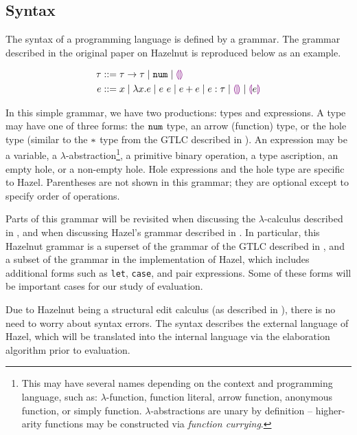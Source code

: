 \subsection{Syntax}
\label{sec:syntax}

The syntax of a programming language is defined by a grammar. The grammar described in the original paper on Hazelnut \cite{conf/popl/Hazelnut17} is reproduced below as an example.

\begin{singlespace}
  \begin{align*}
    \tau &::= \tau\to\tau
         \mid\mathtt{num}
         \mid\textcolor{violet}{\llparenthesis}\textcolor{violet}{\rrparenthesis} \\
    e &::= x
         \mid\lambda x.e
         \mid e\ e
         \mid e+e
         \mid e:\tau
         \mid\textcolor{violet}{\llparenthesis}\textcolor{violet}{\rrparenthesis}
         \mid\textcolor{violet}{\llparenthesis} e\textcolor{violet}{\rrparenthesis}
  \end{align*}
\end{singlespace}

In this simple grammar, we have two productions: types and expressions. A type may have one of three forms: the $\mathtt{num}$ type, an arrow (function) type, or the hole type (similar to the $*$ type from the GTLC described in ). An expression may be a variable, a $\lambda$-abstraction\footnote{This may have several names depending on the context and programming language, such as: $\lambda$-function, function literal, arrow function, anonymous function, or simply function. $\lambda$-abstractions are unary by definition -- higher-arity functions may be constructed via \textit{function currying}.}, a primitive binary operation, a type ascription, an empty hole, or a non-empty hole. Hole expressions and the hole type are specific to Hazel. Parentheses are not shown in this grammar; they are optional except to specify order of operations.

Parts of this grammar will be revisited when discussing the $\lambda$-calculus described in , and when discussing Hazel's grammar described in . In particular, this Hazelnut grammar is a superset of the grammar of the GTLC described in , and a subset of the grammar in the implementation of Hazel, which includes additional forms such as \texttt{let}, \texttt{case}, and pair expressions. Some of these forms will be important cases for our study of evaluation.

Due to Hazelnut being a structural edit calculus (as described in ), there is no need to worry about syntax errors. The syntax describes the external language of Hazel, which will be translated into the internal language via the elaboration algorithm prior to evaluation.

